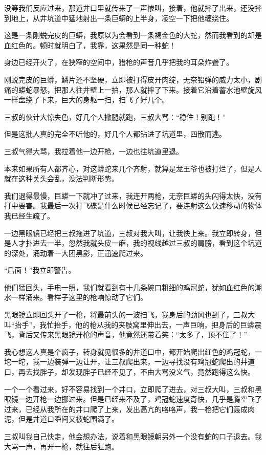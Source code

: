 没等我们反应过来，那道井口里就传来了一声惨叫，接着，他就摔了出来，还没摔到地上，从井坑道中猛地射出一条巨蟒的上半身，凌空一下把他缠绕住。

这是一条刚蜕完皮的巨蟒，我原以为会看到一条褐金色的大蛇，然而我看到的却是血红色的。顿时就明白了，我靠，这果然是同一种蛇！

身边已经开火了，在狭窄的空间中，猎枪的声音几乎把我的耳朵炸聋了。

刚蜕完皮的巨蟒，鳞片还不坚硬，立即被打得皮开肉绽，无奈铅弹的威力太小，剧痛的蟒蛇暴怒，把那人往井壁上一拍，那人就摔了下来。接着它沿着蓄水池壁旋风一样盘绕了下来，巨大的身躯一扫，扫飞了好几个。

三叔的伙计大惊失色，好几个人撒腿就跑，三叔大骂：“稳住！别跑！”

但是这批人真的完全不听他的，好几个人都钻进了坑道里，四散而逃。

三叔气得大骂，我拉着他一边开枪，一边也往坑道里退。

本来如果所有人都齐心，对这蟒蛇来几个齐射，就算是龙王爷也被打烂了，但是人就在这种关头会乱，没法判断形势。

我们退得最慢，巨蟒一下就冲了过来，我连开两枪，无奈巨蟒的头闪得太快，没有打中要害。我最后一次打飞碟是什么时候已经忘记了，要连射这么快速移动的物体我已经生疏了。

一边黑眼镜已经把三叔拖进了坑道，三叔对我大叫，让我快上来。我立即转身，但是人才扑进去一半，忽然我就头皮一麻，我的视线越过三叔的肩膀，看到这个坑道的深处，涌动着一大团黑影，正迅速爬过来。

“后面！”我立即警告。

他们猛回头，手电一照，我们就看到有十几条碗口粗细的鸡冠蛇，犹如血红色的潮水一样涌来。看样子这里的枪响惊动了它们。

黑眼镜立即回头开了一枪，将最前头的一波扫飞，我身后的劲风也到了，三叔大叫“抬手”，我忙抬手，他的枪从我的夹肢窝里伸出去，一声巨响，把身后的巨蟒震飞，背后又传来黑眼镜开枪的声音，他竟然还带着笑：“太多了，顶不住了！”

我心想这人真是个疯子，转身就见很多的井道口中，都开始爬出红色的鸡冠蛇，一坨一坨，我一边装弹一边让开，让三叔爬出来，一边寻找没有鸡冠蛇爬出的井道口，再去找胖子，却发现胖子已经不见了，不由大骂没义气，竟然跑得这么快。

一个一个看过来，好不容易找到一个井口，立即爬了进去，对三叔大叫，三叔和黑眼镜一边开枪一边挪过来。但是已经来不及了，鸡冠蛇速度奇快，几乎是腾空飞了过来，已经从我所在的井口爬了上来，发出高亢的咯咯声，我一枪把它们轰成肉泥，但是井道口瞬间又被蛇围满了。

三叔叫我自己快走，他会想办法，说着和黑眼镜朝另外一个没有蛇的口子退去。我大骂一声，再开一枪，就往后狂跑。

